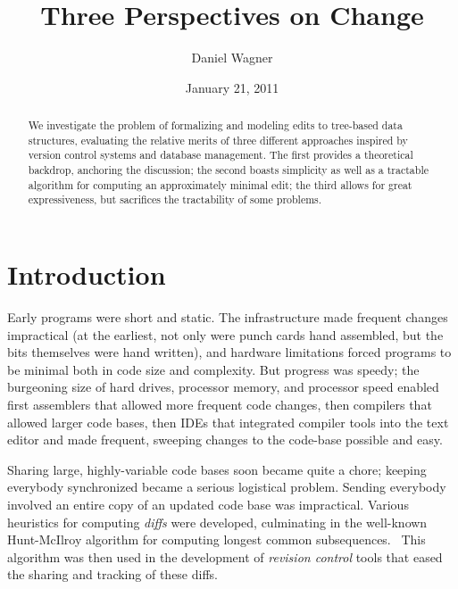 \documentclass{article}
\begin{document}
\title{Three Perspectives on Change}
\author{Daniel Wagner}
\date{January 21, 2011}
\maketitle
\begin{abstract}
    \noindent
    We investigate the problem of formalizing and modeling edits to
    tree-based data structures, evaluating the relative merits of three
    different approaches inspired by version control systems and database
    management. The first provides a theoretical backdrop, anchoring the
    discussion; the second boasts simplicity as well as a tractable
    algorithm for computing an approximately minimal edit; the third allows
    for great expressiveness, but sacrifices the tractability of some
    problems.
\end{abstract}

\section{Introduction}
\label{sec:introduction}
Early programs were short and static. The infrastructure made frequent
changes impractical (at the earliest, not only were punch cards hand
assembled, but the bits themselves were hand written), and hardware
limitations forced programs to be minimal both in code size and complexity.
But progress was speedy; the burgeoning size of hard drives, processor
memory, and processor speed enabled first assemblers that allowed more
frequent code changes, then compilers that allowed larger code bases, then
IDEs that integrated compiler tools into the text editor and made frequent,
sweeping changes to the code-base possible and easy.

Sharing large, highly-variable code bases soon became quite a chore; keeping
everybody synchronized became a serious logistical problem. Sending
everybody involved an entire copy of an updated code base was impractical.
Various heuristics for computing \emph{diffs} were developed, culminating in
the well-known Hunt-McIlroy algorithm for computing longest common
subsequences.~\cite{hunt1976algorithm} This algorithm was then used in the
development of \emph{revision control} tools that eased the sharing and
tracking of these diffs.
\end{document}
